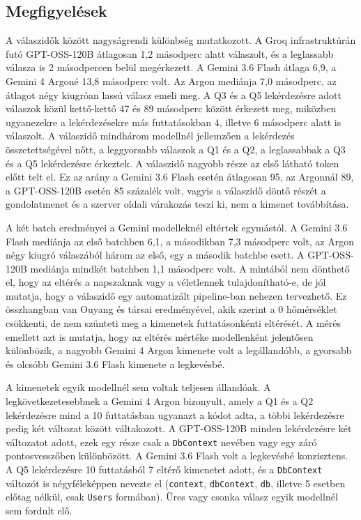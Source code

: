 \documentclass[a4paper,12pt]{article}
\begin{document}
\subsection{Megfigyelések}

A válaszidők között nagyságrendi különbség mutatkozott. A Groq infrastruktúrán futó GPT-OSS-120B átlagosan 1,2 másodperc alatt válaszolt, és a leglassabb válasza is 2 másodpercen belül megérkezett. A Gemini 3.6 Flash átlaga 6,9, a Gemini 4 Argoné 13,8 másodperc volt. Az Argon mediánja 7,0 másodperc, az átlagot négy kiugróan lassú válasz emeli meg. A Q3 és a Q5 lekérdezésre adott válaszok közül kettő-kettő 47 és 89 másodperc között érkezett meg, miközben ugyanezekre a lekérdezésekre más futtatásokban 4, illetve 6 másodperc alatt is válaszolt. A válaszidő mindhárom modellnél jellemzően a lekérdezés összetettségével nőtt, a leggyorsabb válaszok a Q1 és a Q2, a leglassabbak a Q3 és a Q5 lekérdezésre érkeztek. A válaszidő nagyobb része az első látható token előtt telt el. Ez az arány a Gemini 3.6 Flash esetén átlagosan 95, az Argonnál 89, a GPT-OSS-120B esetén 85 százalék volt, vagyis a válaszidő döntő részét a gondolatmenet és a szerver oldali várakozás teszi ki, nem a kimenet továbbítása.

A két batch eredményei a Gemini modelleknél eltértek egymástól. A Gemini 3.6 Flash mediánja az első batchben 6,1, a másodikban 7,3 másodperc volt, az Argon négy kiugró válaszából három az első, egy a második batchbe esett. A GPT-OSS-120B mediánja mindkét batchben 1,1 másodperc volt. A mintából nem dönthető el, hogy az eltérés a napszaknak vagy a véletlennek tulajdonítható-e, de jól mutatja, hogy a válaszidő egy automatizált pipeline-ban nehezen tervezhető. Ez összhangban van Ouyang és társai \cite{ouyang2025nondeterminism} eredményével, akik szerint a 0 hőmérséklet csökkenti, de nem szünteti meg a kimenetek futtatásonkénti eltérését. A mérés emellett azt is mutatja, hogy az eltérés mértéke modellenként jelentősen különbözik, a nagyobb Gemini 4 Argon kimenete volt a legállandóbb, a gyorsabb és olcsóbb Gemini 3.6 Flash kimenete a legkevésbé.

A kimenetek egyik modellnél sem voltak teljesen állandóak. A legkövetkezetesebbnek a Gemini 4 Argon bizonyult, amely a Q1 és a Q2 lekérdezésre mind a 10 futtatásban ugyanazt a kódot adta, a többi lekérdezésre pedig két változat között váltakozott. A GPT-OSS-120B minden lekérdezésre két változatot adott, ezek egy része csak a \texttt{DbContext} nevében vagy egy záró pontosvesszőben különbözött. A Gemini 3.6 Flash volt a legkevésbé konzisztens. A Q5 lekérdezésre 10 futtatásból 7 eltérő kimenetet adott, és a \texttt{DbContext} változót is négyféleképpen nevezte el (\texttt{context}, \texttt{dbContext}, \texttt{db}, illetve 5 esetben előtag nélkül, csak \texttt{Users} formában). Üres vagy csonka válasz egyik modellnél sem fordult elő.
\end{document}
